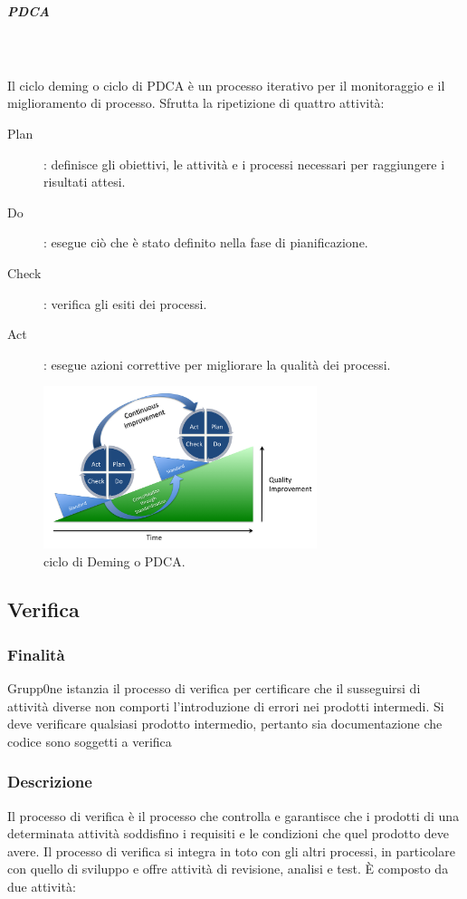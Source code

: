 \documentclass[../norme-di-progetto.tex]{subfiles}
\begin{document}
\subparagraph{PDCA}\mbox{}\\
\label{subp:PDCA}
\\Il ciclo deming o ciclo di PDCA è un processo iterativo per il monitoraggio e il miglioramento di processo. Sfrutta la ripetizione di quattro attività:
\begin{description}
  \item [Plan]: definisce gli obiettivi, le attività e i processi necessari per raggiungere i risultati attesi.
  \item [Do]: esegue ciò che è stato definito nella fase di pianificazione.
  \item [Check]: verifica gli esiti dei processi.
  \item [Act]: esegue azioni correttive per migliorare la qualità dei processi.
\end{description}
\begin{figure}[H]
  \includegraphics[width=8cm]{img/PDCA-process.png}
  \centering
  \caption{ciclo di Deming o PDCA.}
\end{figure}

\subsection{Verifica}
\label{sub:verifica}
\subsubsection{Finalità}
\label{subs:finalità}
Grupp0ne istanzia il processo di verifica  per certificare che il susseguirsi di attività diverse non comporti l'introduzione di errori nei prodotti intermedi.
Si deve verificare qualsiasi prodotto intermedio, pertanto sia documentazione che codice sono soggetti a verifica
\subsubsection{Descrizione}

Il processo di verifica è il processo che controlla e garantisce che i prodotti di una determinata attività soddisfino i requisiti e le condizioni che quel prodotto deve avere. Il processo di verifica si integra in toto con gli altri processi, in particolare con quello di sviluppo e offre attività di revisione, analisi e test. È composto da due attività:
\end{document}
